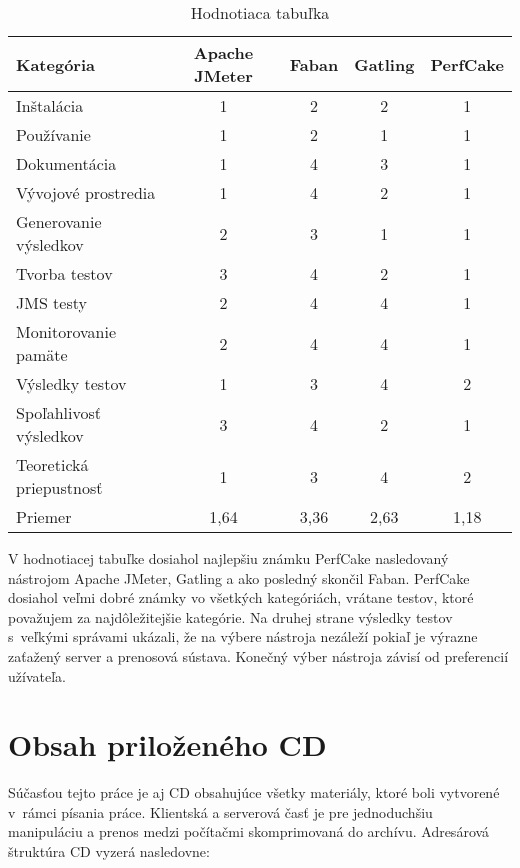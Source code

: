 \documentclass[12pt,oneside,final]{fithesis-utf8}
\begin{document}
\begin{table}[h!]
\begin{center}
\begin{tabular}{ | l | c | c | c | c |}
		\hline
		 \textbf{Kategória} & \textbf{Apache JMeter} & \textbf{Faban} & \textbf{Gatling} & \textbf{PerfCake} \\ \hline
		 Inštalácia & 1 & 2 & 2 & 1 \\ \hline
		 Používanie & 1 & 2 & 1 & 1 \\ \hline
		 Dokumentácia & 1 & 4 & 3 & 1 \\ \hline
		 Vývojové prostredia & 1 & 4 & 2 & 1 \\ \hline
		 Generovanie výsledkov & 2 & 3 & 1 & 1 \\ \hline
		 Tvorba testov & 3 & 4 & 2 & 1 \\ \hline
 		 JMS testy & 2 & 4 & 4 & 1 \\ \hline
		 Monitorovanie pamäte & 2 & 4 & 4 & 1 \\ \hline
		 Výsledky testov & 1 & 3 & 4 & 2 \\ \hline
		 Spoľahlivosť výsledkov & 3 & 4 & 2 & 1 \\ \hline
		 Teoretická priepustnosť & 1 & 3 & 4 & 2 \\ \hline
		 Priemer & 1,64 & 3,36 & 2,63 & 1,18 \\ \hline
		 
\end{tabular}
\end{center}
\caption{Hodnotiaca tabuľka}
\end{table}

V hodnotiacej tabuľke dosiahol najlepšiu známku PerfCake nasledovaný nástrojom Apache JMeter, Gatling a ako posledný skončil Faban. PerfCake dosiahol veľmi dobré známky vo všetkých kategóriách, vrátane testov, ktoré považujem za najdôležitejšie kategórie. Na druhej strane výsledky testov s~veľkými správami ukázali, že na výbere nástroja nezáleží pokiaľ je výrazne zaťažený server a prenosová sústava. Konečný výber nástroja závisí od preferencií užívateľa.




\appendix
\chapter{Obsah priloženého CD}
Súčasťou tejto práce je aj CD obsahujúce všetky materiály, ktoré boli vytvorené v~rámci písania práce. Klientská a serverová časť je pre jednoduchšiu manipuláciu a prenos medzi počítačmi skomprimovaná do archívu. Adresárová štruktúra CD vyzerá nasledovne:
\end{document}
